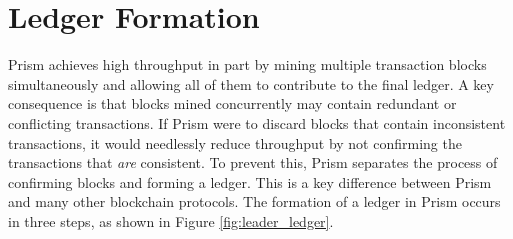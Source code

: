 \section{Ledger Formation}
\label{sec:confirmation}

Prism achieves high throughput in part by mining multiple transaction blocks simultaneously and allowing all of them to contribute to the final ledger. 
A key consequence is that blocks mined concurrently may contain redundant or conflicting transactions.
If Prism were to discard blocks that contain inconsistent transactions, it would needlessly reduce throughput by not confirming the transactions that \emph{are} consistent.
To prevent this, Prism separates the process of confirming blocks and forming a ledger. 
This is a key difference between Prism and many other blockchain protocols.
The formation of a ledger in Prism  occurs in three steps, as shown in Figure \ref{fig:leader_ledger}. 

